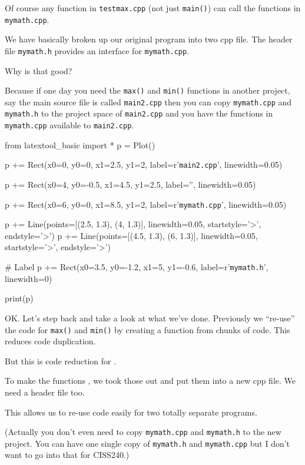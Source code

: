 Of course any function in \texttt{testmax.cpp} (not just \texttt{main()}) can call the functions in \texttt{mymath.cpp}.

We have basically broken up our original program into two cpp file. The header file \texttt{mymath.h} provides an interface for \texttt{mymath.cpp}.

Why is that good?

Because if one day you need the \texttt{max()} and \texttt{min()} functions in another project, say the main source file is called \texttt{main2.cpp} then you can copy \texttt{mymath.cpp} and \texttt{mymath.h} to the project space of \texttt{main2.cpp} and you have the functions in \texttt{mymath.cpp} available to \texttt{main2.cpp}.

\begin{python}
from latextool_basic import *
p = Plot()

p += Rect(x0=0, y0=0, x1=2.5, y1=2, label=r'{\tt main2.cpp}', linewidth=0.05)

p += Rect(x0=4, y0=-0.5, x1=4.5, y1=2.5, label='', linewidth=0.05)

p += Rect(x0=6, y0=0, x1=8.5, y1=2, label=r'{\tt mymath.cpp}', linewidth=0.05)

p += Line(points=[(2.5, 1.3), (4, 1.3)], linewidth=0.05, startstyle='>', endstyle='>')
p += Line(points=[(4.5, 1.3), (6, 1.3)], linewidth=0.05, startstyle='>', endstyle='>')

# Label
p += Rect(x0=3.5, y0=-1.2, x1=5, y1=-0.6, label=r'{\tt mymath.h}', linewidth=0)

print(p)
\end{python}


OK. Let's step back and take a look at what
we've done. Previously we ``re-use'' the code for
\texttt{max()} and \texttt{min()} by creating a function from chunks of
code. This reduces code duplication.

But this is code reduction for .

To make the functions , we took those out and put
them into a new cpp file. We need a header file too.

This allows us to re-use code easily for two totally separate programs.

(Actually you don't even need to copy \texttt{mymath.cpp}
and \texttt{mymath.h} to the new project. You can have one single copy of
\texttt{mymath.h} and \texttt{mymath.cpp} but I don't want
to go into that for CISS240.)

